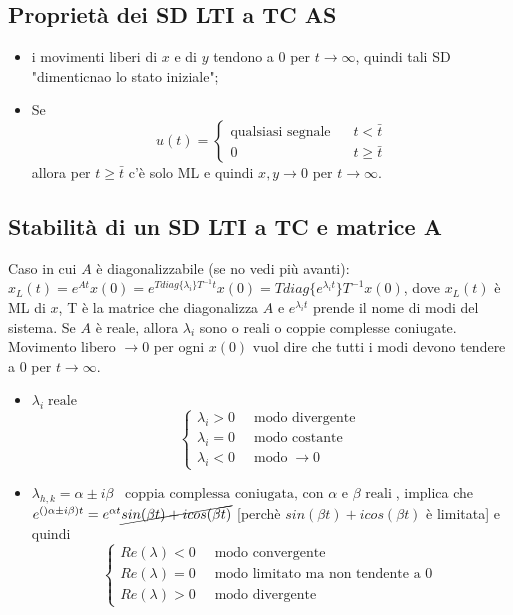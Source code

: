 \subsection{Proprietà dei SD LTI a TC AS}
\begin{itemize}
    \item i movimenti liberi di $x$ e di $y$ tendono a $0$ per $t \rightarrow  \infty$, quindi tali SD "dimenticnao lo stato iniziale";
    \item Se 
    \[
        u(t) = \begin{cases}
            \text{qualsiasi segnale}\; \;\; & t< \bar{t}\\
            0 & t \geq \bar{t}
        \end{cases}
    \]
    allora per $t \geq \bar{t}$ c'è solo ML e quindi $x,y \rightarrow 0$ per $t \rightarrow \infty$.
\end{itemize}
\subsection{Stabilità di un SD LTI a TC e matrice A}
Caso in cui $A$ è diagonalizzabile (se no vedi più avanti):
$x_L (t) = e^{At} x(0) = e^{T diag\{\lambda_i\}T^{-1} t}x(0) = T diag\{e^{\lambda_i t}\}T^{-1}x(0)$, dove $x_L(t)$ è ML di $x$, T è la matrice che diagonalizza $A$ e $e^{\lambda_it}$ prende il nome di modi del sistema.\newline
\newline
Se $A$ è reale, allora $\lambda_i$ sono o reali o coppie complesse coniugate.\newline
Movimento libero $\rightarrow  0$ per ogni $x(0)$ vuol dire che tutti i modi devono tendere a $0$ per $t \rightarrow \infty$.
\begin{itemize}
    \item $\lambda_i \; \text{reale}$
    \[
        \begin{cases}
            \lambda_i >0 \;\;& \text{modo divergente}\;\\
            \lambda_i =0 \;\;& \text{modo costante}\;\\
            \lambda_i <0 \;\;& \text{modo}\;\rightarrow  0
        \end{cases}
    \]
    \item $\lambda_{h,k} = \alpha \pm i \beta \;\;\;\text{coppia complessa coniugata, con $\alpha$ e $\beta$ reali}\;$, implica che $e^{()\alpha \pm i \beta)t} = e^{\alpha t} \cancel{sin(\beta t) + i cos(\beta t)}$ [perchè $sin(\beta t) + i cos(\beta t)$ è limitata] e quindi
    \[
        \begin{cases}
            Re(\lambda) < 0 \;\; & \text{modo convergente}\;\\
            Re(\lambda) = 0 \;\; & \text{modo limitato ma non tendente a $0$}\;\\
            Re(\lambda) > 0 \;\; & \text{modo divergente}\;
        \end{cases}
    \]
\end{itemize}
